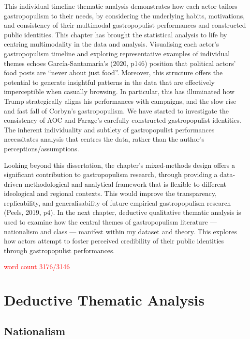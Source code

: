 \documentclass[a4paper, nobind]{templates/ociamthesis}
\begin{document}
This individual timeline thematic analysis demonstrates how each actor tailors gastropopulism to their needs, by considering the underlying habits, motivations, and consistency of their multimodal gastropopulist performances and constructed public identities. This chapter has brought the statistical analysis to life by centring multimodality in the data and analysis. Visualising each actor's gastropopulism timeline and exploring representative examples of individual themes echoes García-Santamaría's (2020, p146) position that political actors' food posts are ``never about just food''. Moreover, this structure offers the potential to generate insightful patterns in the data that are effectively imperceptible when casually browsing. In particular, this has illuminated how Trump strategically aligns his performances with campaigns, and the slow rise and fast fall of Corbyn's gastropopulism. We have started to investigate the consistency of AOC and Farage's carefully constructed gastropopulist identities. The inherent individuality and subtlety of gastropopulist performances necessitates analysis that centres the data, rather than the author's perceptions/assumptions.

Looking beyond this dissertation, the chapter's mixed-methods design offers a significant contribution to gastropopulism research, through providing a data-driven methodological and analytical framework that is flexible to different ideological and regional contexts. This would improve the transparency, replicability, and generalisability of future empirical gastropopulism research (Peels, 2019, p4). In the next chapter, deductive qualitative thematic analysis is used to examine how the central themes of gastropopulism literature --- nationalism and class --- manifest within my dataset and theory. This explores how actors attempt to foster perceived credibility of their public identities through gastropopulist performances.

\textcolor{red}{word count 3176/3146}

\hypertarget{deductive-thematic-analysis}{%
\chapter{Deductive Thematic Analysis}\label{deductive-thematic-analysis}}

\hypertarget{nationalism}{%
\section{Nationalism}\label{nationalism}}
\end{document}
